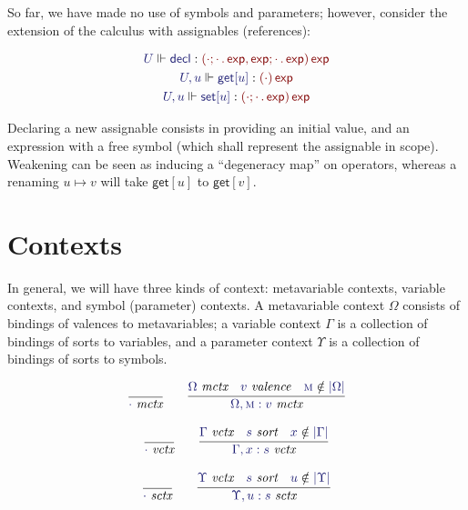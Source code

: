 \documentclass[11pt]{article}
\theoremstyle{definition}
\theoremstyle{remark}
\numberwithin{equation}{section}
\def\IModeColorName{MidnightBlue}
\def\OModeColorName{Maroon}
\newcommand\IMode[1]{{\color{\IModeColorName}{#1}}}
\newcommand\OMode[1]{{\color{\OModeColorName}{#1}}}
\newcommand\MkValence[3]{#1;#2\,.\, #3}
\newcommand\MkArity[2]{\left(#1\right) #2}
\newcommand\IsValence[1]{\IMode{#1}\ \textit{valence}}
\newcommand\IsSort[1]{\IMode{#1}\ \textit{sort}}
\newcommand\IsOperator[3]{\IMode{#1}\Vdash \IMode{#2} : \OMode{#3}}
\newcommand\IsMetaCtx[1]{\IMode{#1}\ \textit{mctx}}
\newcommand\IsVarCtx[1]{\IMode{#1}\ \textit{vctx}}
\newcommand\IsSymCtx[1]{\IMode{#1}\ \textit{sctx}}
\newcommand\MV[1]{\textsc{#1}}
\newcommand\Dom[1]{\left\vert #1\right\vert}
\newcommand\Fresh[2]{\IMode{#1}\notin\IMode{\Dom{#2}}}
\newcommand\SortExp{\mathsf{exp}}
\begin{document}
So far, we have made no use of symbols and parameters; however, consider the
extension of the calculus with assignables (references):

\begin{gather*}
  \IsOperator{U}{\mathsf{decl}}{
    \MkArity{
      \MkValence{\cdot}{\cdot}{\SortExp},
      \MkValence{\SortExp}{\cdot}{\SortExp}
    }{
      \SortExp
    }
  }\\
  \IsOperator{U,u}{\mathsf{get}[u]}{
    \MkArity{
      \cdot
    }{
      \SortExp
    }
  }\\
  \IsOperator{U,u}{\mathsf{set}[u]}{
    \MkArity{
      \MkValence{\cdot}{\cdot}{\SortExp}
    }{
      \SortExp
    }
  }
\end{gather*}

Declaring a new assignable consists in providing an initial value, and an
expression with a free symbol (which shall represent the assignable in scope).
Weakening can be seen as inducing a ``degeneracy map'' on operators, whereas a
renaming $u\mapsto v$ will take $\mathsf{get}[u]$ to $\mathsf{get}[v]$.

\section{Contexts}

In general, we will have three kinds of context: metavariable contexts,
variable contexts, and symbol (parameter) contexts. A metavariable context
$\Omega$ consists of bindings of valences to metavariables; a variable context
$\Gamma$ is a collection of bindings of sorts to variables, and a parameter
context $\Upsilon$ is a collection of bindings of sorts to symbols.

\begin{gather*}
  \infer{
    \IsMetaCtx{\cdot}
  }{
  }\qquad
  \infer{
    \IsMetaCtx{\Omega,\MV{m}:v}
  }{
    \IsMetaCtx{\Omega} &
    \IsValence{v} &
    \Fresh{\MV{m}}{\Omega}
  }
\end{gather*}

\begin{gather*}
  \infer{
    \IsVarCtx{\cdot}
  }{
  }\qquad
  \infer{
    \IsVarCtx{\Gamma,x:s}
  }{
    \IsVarCtx{\Gamma} &
    \IsSort{s} &
    \Fresh{x}{\Gamma}
  }
\end{gather*}

\begin{gather*}
  \infer{
    \IsSymCtx{\cdot}
  }{
  }\qquad
  \infer{
    \IsSymCtx{\Upsilon,u:s}
  }{
    \IsVarCtx{\Upsilon} &
    \IsSort{s} &
    \Fresh{u}{\Upsilon}
  }
\end{gather*}
\end{document}
